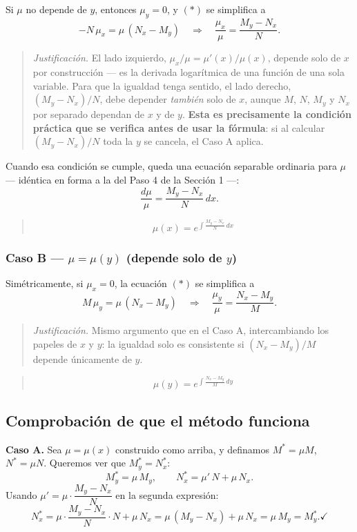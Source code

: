 \documentclass[12pt,letterpaper]{article}
\newcommand{\justif}[1]{%
  \par\noindent
  {\small\color{JustifColor}%
  \begin{quote}
  \textit{Justificación.} #1
  \end{quote}}%
}
\newenvironment{resultado}
  {\begin{quote}\color{ResultColor}\bfseries}
  {\end{quote}}
\newcommand{\paso}[1]{\subsubsection*{#1}}
\begin{document}
Si $\mu$ no depende de $y$, entonces $\mu_y = 0$, y $(\ast)$ se simplifica a
\[
-N\,\mu_x = \mu\,(N_x - M_y)
\quad\Longrightarrow\quad
\frac{\mu_x}{\mu} = \frac{M_y - N_x}{N}.
\]

\justif{El lado izquierdo, $\mu_x/\mu = \mu'(x)/\mu(x)$, depende solo de
$x$ por construcción --- es la derivada logarítmica de una función de una
sola variable. Para que la igualdad tenga sentido, el lado derecho,
$(M_y-N_x)/N$, debe depender \emph{también} solo de $x$, aunque $M$, $N$,
$M_y$ y $N_x$ por separado dependan de $x$ y de $y$. \textbf{Esta es
precisamente la condición práctica que se verifica antes de usar la
fórmula}: si al calcular $(M_y-N_x)/N$ toda la $y$ se cancela, el Caso A
aplica.}

Cuando esa condición se cumple, queda una ecuación separable ordinaria para
$\mu$ --- idéntica en forma a la del Paso 4 de la Sección 1 ---:
\[
\frac{d\mu}{\mu} = \frac{M_y-N_x}{N}\,dx.
\]

\begin{resultado}
\[
\mu(x) = e^{\int \frac{M_y-N_x}{N}\,dx}
\]
\end{resultado}

\paso{Caso B --- $\mu = \mu(y)$ (depende solo de $y$)}

Simétricamente, si $\mu_x = 0$, la ecuación $(\ast)$ se simplifica a
\[
M\,\mu_y = \mu\,(N_x - M_y)
\quad\Longrightarrow\quad
\frac{\mu_y}{\mu} = \frac{N_x - M_y}{M}.
\]

\justif{Mismo argumento que en el Caso A, intercambiando los papeles de $x$
y $y$: la igualdad solo es consistente si $(N_x-M_y)/M$ depende únicamente
de $y$.}

\begin{resultado}
\[
\mu(y) = e^{\int \frac{N_x-M_y}{M}\,dy}
\]
\end{resultado}

\subsection*{Comprobación de que el método funciona}

\textbf{Caso A.} Sea $\mu=\mu(x)$ construido como arriba, y definamos
$M^{*} = \mu M$, $N^{*} = \mu N$. Queremos ver que $M^{*}_y = N^{*}_x$:
\[
M^{*}_y = \mu\, M_y,
\qquad
N^{*}_x = \mu'\,N + \mu\, N_x.
\]
Usando $\mu' = \mu \cdot \dfrac{M_y-N_x}{N}$ en la segunda expresión:
\[
N^{*}_x
= \mu\cdot\frac{M_y-N_x}{N}\cdot N + \mu\,N_x
= \mu\,(M_y-N_x) + \mu\,N_x
= \mu\,M_y
= M^{*}_y. \checkmark
\]
\end{document}
